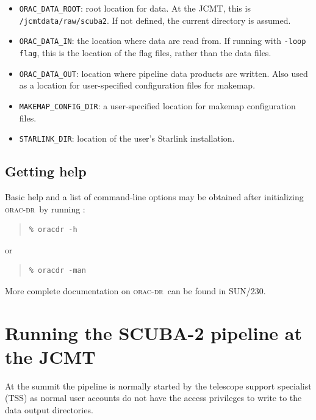 \documentclass[twoside,11pt]{article}
\newcommand{\xref}[3]{#1}
\newcommand{\xlabel}[1]{}
\renewcommand{\_}{\texttt{\symbol{95}}}
\newenvironment{myquote}{\begin{quote}\begin{small}}{\end{small}\end{quote}}
\newcommand{\oracdr}{\textsc{orac-dr}}
\newcommand{\oracsun}{\xref{SUN/230}{sun230}{}}
\newcommand{\task}[1]{\textsf{#1}}
\begin{document}
\begin{itemize}

\item \verb+ORAC_DATA_ROOT+: root location for data. At the JCMT,
  this is \verb+/jcmtdata/raw/scuba2+. If not defined, the current
  directory is assumed.

\item \verb+ORAC_DATA_IN+: the location where data are read from. If
  running with \verb+-loop flag+, this is the location of the flag
  files, rather than the data files.

\item \verb+ORAC_DATA_OUT+: location where pipeline data products are
  written. Also used as a location for user-specified configuration
  files for \task{makemap}.

\item \verb+MAKEMAP_CONFIG_DIR+: a user-specified location for
  \task{makemap} configuration files.

\item \verb+STARLINK_DIR+: location of the user's Starlink
  installation.

\end{itemize}

\subsection{Getting help}

Basic help and a list of command-line options may be obtained after
initializing \oracdr\ by running :
\begin{myquote}
\begin{verbatim}
% oracdr -h
\end{verbatim}
\end{myquote}
or
\begin{myquote}
\begin{verbatim}
% oracdr -man
\end{verbatim}
\end{myquote}

More complete documentation on \oracdr\ can be found in \oracsun.

\section{\xlabel{runpipeline}Running the SCUBA-2 pipeline at the JCMT\label{se:runpipe}}

At the summit the pipeline is normally started by the telescope
support specialist (TSS) as normal user accounts do not have the
access privileges to write to the data output directories.
\end{document}
